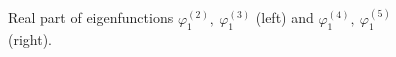 \documentclass[authoryear]{elsarticle}
\begin{document}
\begin{figure}[htp]
  \begin{center}
\begin{minipage}{0.49\linewidth}
 \\
\end{minipage}
\hfill
\begin{minipage}{0.49\linewidth}
 \\
\end{minipage}
\caption{Real part of eigenfunctions $\varphi^{(2)}_1, \ \varphi^{(3)}_1$ (left) and $\varphi^{(4)}_1, \ \varphi^{(5)}_1$ (right).}
\label{fig:8}
  \end{center}
\end{figure}
\end{document}
